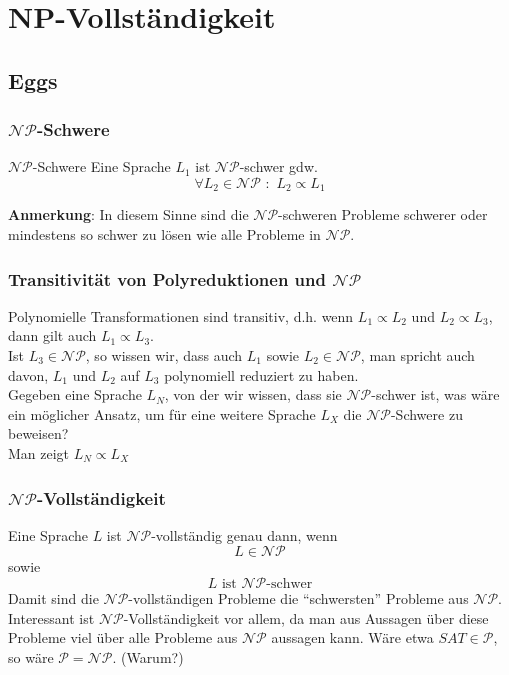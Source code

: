 \section{NP-Vollständigkeit}
\subsection{Eggs}
\begin{frame}
\frametitle{$\mathcal{NP}$-Schwere}
\begin{block}{$\mathcal{NP}$-Schwere}
Eine Sprache $L_1$ ist $\mathcal{NP}$-schwer gdw. 
\[\forall L_2 \in \mathcal{NP} \,\, : \,\, L_2 \propto L_1\]
\end{block}
\textbf{Anmerkung}: In diesem Sinne sind die $\mathcal{NP}$-schweren Probleme schwerer oder mindestens so schwer zu lösen wie alle Probleme in $\mathcal{NP}$.
\end{frame}

\begin{frame}
\frametitle{Transitivität von Polyreduktionen und $\mathcal{NP}$}
Polynomielle Transformationen sind transitiv, d.h. wenn $L_1 \propto L_2$ und $L_2 \propto L_3$, dann gilt auch $L_1 \propto L_3$.\\[8pt]
Ist $L_3 \in \mathcal{NP}$, so wissen wir, dass auch $L_1$ sowie $L_2 \in \mathcal{NP}$, man spricht auch davon, $L_1$ und $L_2$ auf $L_3$ polynomiell reduziert zu haben.\\[8pt]
Gegeben eine Sprache $L_N$, von der wir wissen, dass sie $\mathcal{NP}$-schwer ist, was wäre ein möglicher Ansatz, um für eine weitere Sprache $L_X$ die $\mathcal{NP}$-Schwere zu beweisen?\\
\invincible\pause
Man zeigt $L_N \propto L_X$
\vincible
\end{frame}

\begin{frame}
\frametitle{$\mathcal{NP}$-Vollständigkeit}
Eine Sprache $L$ ist $\mathcal{NP}$-vollständig genau dann, wenn
$$L \in \mathcal{NP}$$ sowie $$L\mbox{ ist $\mathcal{NP}$-schwer}$$
Damit sind die $\mathcal{NP}$-vollständigen Probleme die "`schwersten"' Probleme aus $\mathcal{NP}$.\\
Interessant ist $\mathcal{NP}$-Vollständigkeit vor allem, da man aus Aussagen über diese Probleme viel über alle Probleme aus $\mathcal{NP}$ aussagen kann.
Wäre etwa $SAT \in \mathcal{P}$, so wäre $\mathcal{P} = \mathcal{NP}$. (Warum?)
\end{frame}

